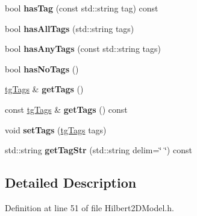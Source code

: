 \begin{DoxyCompactItemize}
\item 
\hypertarget{classtg_taggable_ae31f65869c8887bfeb34a344902c4d5b}{bool {\bfseries has\-Tag} (const std\-::string tag) const }\label{classtg_taggable_ae31f65869c8887bfeb34a344902c4d5b}

\item 
\hypertarget{classtg_taggable_a33b77b1075171b63f673965687b2e844}{bool {\bfseries has\-All\-Tags} (std\-::string tags)}\label{classtg_taggable_a33b77b1075171b63f673965687b2e844}

\item 
\hypertarget{classtg_taggable_af14af28fa98021c4f20a5e8f2ddd5606}{bool {\bfseries has\-Any\-Tags} (const std\-::string tags)}\label{classtg_taggable_af14af28fa98021c4f20a5e8f2ddd5606}

\item 
\hypertarget{classtg_taggable_adff345e116e16420c701a748ff8f995f}{bool {\bfseries has\-No\-Tags} ()}\label{classtg_taggable_adff345e116e16420c701a748ff8f995f}

\item 
\hypertarget{classtg_taggable_acf1d7fa9df8f374f25015c4080902681}{\hyperlink{classtg_tags}{tg\-Tags} \& {\bfseries get\-Tags} ()}\label{classtg_taggable_acf1d7fa9df8f374f25015c4080902681}

\item 
\hypertarget{classtg_taggable_ae70d7d3b45301665bc363b0ed8b9b292}{const \hyperlink{classtg_tags}{tg\-Tags} \& {\bfseries get\-Tags} () const }\label{classtg_taggable_ae70d7d3b45301665bc363b0ed8b9b292}

\item 
\hypertarget{classtg_taggable_a5492888e4e4da4cca6261070b5726adf}{void {\bfseries set\-Tags} (\hyperlink{classtg_tags}{tg\-Tags} tags)}\label{classtg_taggable_a5492888e4e4da4cca6261070b5726adf}

\item 
\hypertarget{classtg_taggable_a346d66b066d2d9eb1eadba01da43749f}{std\-::string {\bfseries get\-Tag\-Str} (std\-::string delim=\char`\"{} \char`\"{}) const }\label{classtg_taggable_a346d66b066d2d9eb1eadba01da43749f}

\end{DoxyCompactItemize}


\subsection{Detailed Description}


Definition at line 51 of file Hilbert2\-D\-Model.\-h.



